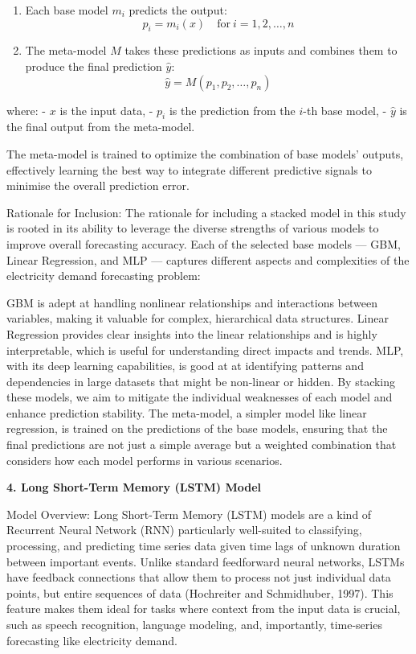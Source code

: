\documentclass[
]{article}
\begin{document}
\begin{enumerate}
\def\labelenumi{\arabic{enumi}.}
\item
  Each base model \(m_i\) predicts the output:
  \[ p_i = m_i(x) \quad \text{for} \ i = 1, 2, \ldots, n \]
\item
  The meta-model \(M\) takes these predictions as inputs and combines
  them to produce the final prediction \(\hat{y}\):
  \[ \hat{y} = M(p_1, p_2, \ldots, p_n) \]
\end{enumerate}

where: - \(x\) is the input data, - \(p_i\) is the prediction from the
\(i\)-th base model, - \(\hat{y}\) is the final output from the
meta-model.

The meta-model is trained to optimize the combination of base models'
outputs, effectively learning the best way to integrate different
predictive signals to minimise the overall prediction error.

Rationale for Inclusion: The rationale for including a stacked model in
this study is rooted in its ability to leverage the diverse strengths of
various models to improve overall forecasting accuracy. Each of the
selected base models --- GBM, Linear Regression, and MLP --- captures
different aspects and complexities of the electricity demand forecasting
problem:

GBM is adept at handling nonlinear relationships and interactions
between variables, making it valuable for complex, hierarchical data
structures. Linear Regression provides clear insights into the linear
relationships and is highly interpretable, which is useful for
understanding direct impacts and trends. MLP, with its deep learning
capabilities, is good at at identifying patterns and dependencies in
large datasets that might be non-linear or hidden. By stacking these
models, we aim to mitigate the individual weaknesses of each model and
enhance prediction stability. The meta-model, a simpler model like
linear regression, is trained on the predictions of the base models,
ensuring that the final predictions are not just a simple average but a
weighted combination that considers how each model performs in various
scenarios.

\textbf{4. Long Short-Term Memory (LSTM) Model}

Model Overview: Long Short-Term Memory (LSTM) models are a kind of
Recurrent Neural Network (RNN) particularly well-suited to classifying,
processing, and predicting time series data given time lags of unknown
duration between important events. Unlike standard feedforward neural
networks, LSTMs have feedback connections that allow them to process not
just individual data points, but entire sequences of data (Hochreiter
and Schmidhuber, 1997). This feature makes them ideal for tasks where
context from the input data is crucial, such as speech recognition,
language modeling, and, importantly, time-series forecasting like
electricity demand.
\end{document}
